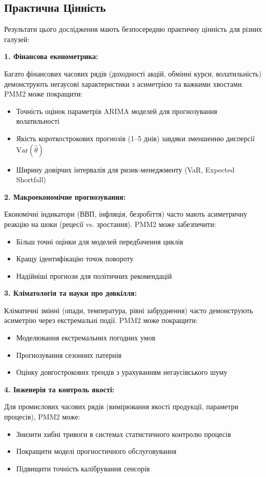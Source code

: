 \documentclass[12pt,a4paper]{article}
\begin{document}
	\subsection{Практична Цінність}
	\label{subsec:practical_value}
	
	Результати цього дослідження мають безпосередню практичну цінність для різних галузей:
	
	\textbf{1. Фінансова економетрика:}
	
	Багато фінансових часових рядів (доходності акцій, обмінні курси, волатильність) демонструють негаусові характеристики з асиметрією та важкими хвостами. PMM2 може покращити:
	\begin{itemize}
		\item Точність оцінок параметрів ARIMA моделей для прогнозування волатильності
		\item Якість короткострокових прогнозів (1--5 днів) завдяки зменшенню дисперсії $\text{Var}(\hat{\theta})$
		\item Ширину довірчих інтервалів для ризик-менеджменту (VaR, Expected Shortfall)
	\end{itemize}
	
	\textbf{2. Макроекономічне прогнозування:}
	
	Економічні індикатори (ВВП, інфляція, безробіття) часто мають асиметричну реакцію на шоки (рецесії vs. зростання). PMM2 може забезпечити:
	\begin{itemize}
		\item Більш точні оцінки для моделей передбачення циклів
		\item Кращу ідентифікацію точок повороту
		\item Надійніші прогнози для політичних рекомендацій
	\end{itemize}
	
	\textbf{3. Кліматологія та науки про довкілля:}
	
	Кліматичні змінні (опади, температура, рівні забруднення) часто демонструють асиметрію через екстремальні події. PMM2 може покращити:
	\begin{itemize}
		\item Моделювання екстремальних погодних умов
		\item Прогнозування сезонних патернів
		\item Оцінку довгострокових трендів з урахуванням негаусівського шуму
	\end{itemize}
	
	\textbf{4. Інженерія та контроль якості:}
	
	Для промислових часових рядів (вимірювання якості продукції, параметри процесів), PMM2 може:
	\begin{itemize}
		\item Знизити хибні тривоги в системах статистичного контролю процесів
		\item Покращити моделі прогностичного обслуговування
		\item Підвищити точність калібрування сенсорів
	\end{itemize}
	
\end{document}
